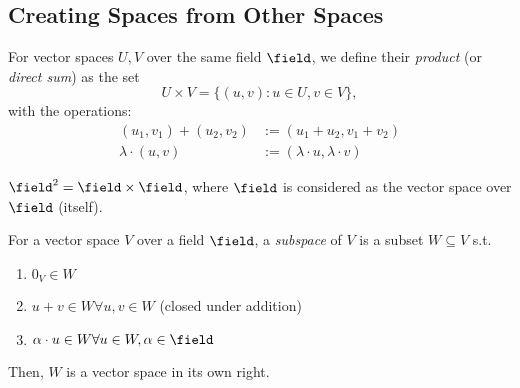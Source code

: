 
\subsection{Creating Spaces from Other Spaces}
\begin{definition}
For vector spaces $U, V$ over the same field $\field$, we define their \emph{product} (or \emph{direct sum}) as the set $$U \times V = \{(u,v):u \in U, v \in V\},$$ with the operations:
\begin{align*}
    (u_1, v_1) + (u_2, v_2) &:= (u_1 + u_2, v_1 + v_2)\\
    \lambda \cdot (u, v)&:= (\lambda \cdot u, \lambda \cdot v)
\end{align*}
\end{definition}

\begin{example}[$\field$]
    $\field^2 = \field \times \field$, where $\field$ is considered as the vector space over $\field$ (itself).
\end{example}
\newpage
\begin{definition}[Subspace]
    For a vector space $V$ over a field $\field$, a \emph{subspace} of $V$ is a subset $W \subseteq V$ s.t.\begin{enumerate}
        \item $0_V \in W$\footnotemark
        \item $u + v \in W \forall u, v \in W$ (closed under addition)
        \item $\alpha \cdot u \in W \forall u \in W, \alpha \in \field$\footnotemark
    \end{enumerate}    
    Then, $W$ is a vector space in its own right.
\end{definition}



